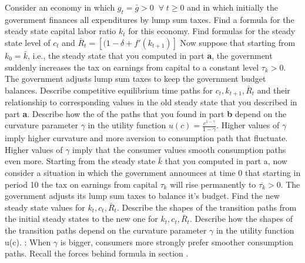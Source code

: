 \medskip
{}
\medskip
\noindent
 Consider an economy  in which $g_t=\bar g > 0 \;\; \forall\; t\geq0$
and in which initially the government finances all expenditures by lump sum taxes.
\medskip
{} Find a formula for the steady state capital labor ratio $k_t$ for this economy.
Find  formulas for the steady state level of $c_t$ and $\bar R_t = [(1-\delta + f'(k_{t+1})]$
\medskip
{} Now suppose that starting from $k_0=\bar k$, i.e., the steady state that you computed in part {\bf a}, the government suddenly increases the tax on earnings from capital to a constant level $\tau_{k} > 0 $. The government adjusts lump sum taxes to keep the government budget balances. Describe competitive equilibrium time paths for $c_t, k_{t+1},\bar R_t$ and their relationship to corresponding values in the old steady state that you described in part {\bf a}.
\medskip
{} Describe how the  of the paths that you found in part {\bf b} depend on the curvature parameter $\gamma$ in the utility function  $u(c) = {\frac{c^{1-\gamma}}{1-\gamma}}$. Higher values of $\gamma$ imply higher curvature and more aversion to consumption path that fluctuate.
Higher values of $\gamma$ imply that the consumer values smooth consumption paths even more. \medskip\noindent
%
\medskip
{} Starting from the steady state $\bar k$ that you computed in part a, now consider a situation in which the government announces at time 0 that starting in period 10 the tax on earnings from capital $\tau_k$ will rise permanently to $\overline {\tau_k}>0$. The government adjusts its lump sum taxes to balance it's budget.
\medskip
{} Find the new steady state values for $k_t,c_t,\bar R_t$.
\medskip
{} Describe the shapes of the transition paths from the initial steady states to the new one for $k_t,c_t,\bar R_t$.
\medskip
{} Describe how the shapes of the transition paths depend on the curvature parameter $\gamma$ in the utility function u(c).
\medskip
{} : When $\gamma$ is bigger, consumers more strongly prefer smoother consumption paths.  Recall the forces behind formula   in section .


